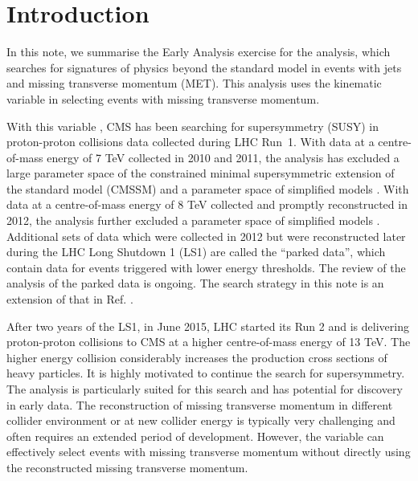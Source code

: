 \section{Introduction}
\label{sec:intro}

In this note, we summarise the Early Analysis exercise for the \alphat
analysis, which searches for signatures of physics beyond the standard
model in events with jets and missing transverse momentum (MET). This
analysis uses the kinematic variable \alphat in selecting events with
missing transverse momentum.

With this variable \alphat, CMS has been searching for supersymmetry
(SUSY) in proton-proton collisions data collected during LHC Run~1. With
data at a centre-of-mass energy of 7 TeV collected in 2010 and 2011, the
\alphat analysis has excluded a large parameter space of the constrained
minimal supersymmetric extension of the standard model (CMSSM)
\cite{Khachatryan:2011tk, Chatrchyan:2011zy, Chatrchyan:2012wa} and a
parameter space of simplified models \cite{Chatrchyan:2012wa}. With data
at a centre-of-mass energy of 8 TeV collected and promptly reconstructed
in 2012, the \alphat analysis further excluded a parameter space of
simplified models \cite{Chatrchyan:2013lya}. Additional sets of data
which were collected in 2012 but were reconstructed later during the LHC
Long Shutdown 1 (LS1) are called the ``parked data'', which contain data
for events triggered with lower energy thresholds. The review of the
\alphat analysis of the parked data \cite{CMS_AN_2013-366} is ongoing.
The search strategy in this note is an extension of that in Ref.
\cite{CMS_AN_2013-366}.

After two years of the LS1, in June 2015, LHC started its Run 2 and is
delivering proton-proton collisions to CMS at a higher centre-of-mass
energy of 13 TeV. The higher energy collision considerably increases the
production cross sections of heavy particles. It is highly motivated to
continue the search for supersymmetry. The \alphat analysis is
particularly suited for this search and has potential for discovery in
early data. The reconstruction of missing transverse momentum in
different collider environment or at new collider energy is typically
very challenging and often requires an extended period of development.
However, the \alphat variable can effectively select events with missing
transverse momentum without directly using the reconstructed missing
transverse momentum.

